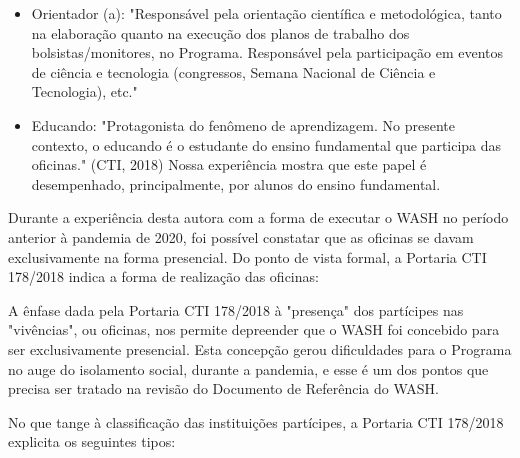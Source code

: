 \begin{itemize}
\item Orientador (a): "Responsável pela orientação científica e metodológica, tanto na elaboração quanto na execução dos planos de trabalho dos bolsistas/monitores, no Programa. Responsável pela participação em eventos de ciência e tecnologia (congressos, Semana Nacional de Ciência e Tecnologia), etc."
\item Educando: "Protagonista do fenômeno de aprendizagem. No presente contexto, o educando é o estudante do ensino fundamental que participa das oficinas." (CTI, 2018) Nossa experiência mostra que este papel é desempenhado, principalmente, por alunos do ensino fundamental.
\end{itemize}

Durante a experiência desta autora com a forma de executar o WASH no período anterior à pandemia de 2020, foi possível constatar que as oficinas se davam exclusivamente na forma presencial. Do ponto de vista formal, a Portaria CTI 178/2018 indica  a forma de realização das oficinas:


\noindent\begin{flushright}\mbox{\linespread{1}\selectfont\centering{}}\end{flushright}


A ênfase dada pela Portaria CTI 178/2018 à "presença" dos partícipes nas "vivências", ou oficinas, nos permite depreender que o WASH foi concebido para ser exclusivamente presencial. Esta concepção gerou dificuldades para o Programa no auge do isolamento social, durante a pandemia, e esse é um dos pontos que precisa ser tratado na revisão do Documento de Referência do WASH.

No que tange à classificação das instituições partícipes, a Portaria CTI 178/2018 explicita os seguintes tipos:


